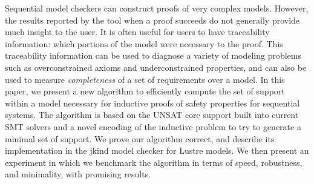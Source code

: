 ﻿Sequential model checkers can construct proofs of very complex models.  However, the results reported by the tool when a proof succeeds do not generally provide much insight to the user.  It is often useful for users to have traceability information: which portions of the model were necessary to the proof.  This traceability information can be used to diagnose a variety of modeling problems such as overconstrained axioms and underconstrained properties, and can also be used to measure {\em completeness} of a set of requirements over a model.  In this paper, we present a new algorithm to efficiently compute the set of support within a model necessary for inductive proofs of safety properties for sequential systems.  The algorithm is based on the UNSAT core support built into current SMT solvers and a novel encoding of the inductive problem to try to generate a minimal set of support.  We prove our algorithm correct, and describe its implementation in the jkind model checker for Lustre models.  We then present an experiment in which we benchmark the algorithm in terms of speed, robustness, and minimality, with promising results.

